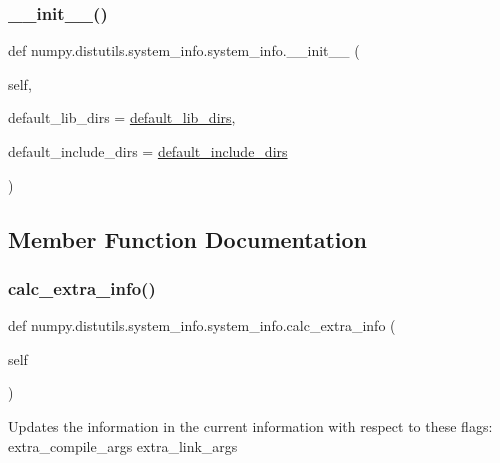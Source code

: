 \subsubsection{\texorpdfstring{\+\_\+\+\_\+init\+\_\+\+\_\+()}{\_\_init\_\_()}}
{\footnotesize\ttfamily def numpy.\+distutils.\+system\+\_\+info.\+system\+\_\+info.\+\_\+\+\_\+init\+\_\+\+\_\+ (\begin{DoxyParamCaption}\item[{}]{self,  }\item[{}]{default\+\_\+lib\+\_\+dirs = {\ttfamily \hyperlink{namespacenumpy_1_1distutils_1_1system__info_ac60e6bb3dff22d8f4f250d1b4ba42899}{default\+\_\+lib\+\_\+dirs}},  }\item[{}]{default\+\_\+include\+\_\+dirs = {\ttfamily \hyperlink{namespacenumpy_1_1distutils_1_1system__info_ad2cd2857056589dcb7cacb98be3d2b20}{default\+\_\+include\+\_\+dirs}} }\end{DoxyParamCaption})}



\subsection{Member Function Documentation}
\mbox{\label{classnumpy_1_1distutils_1_1system__info_1_1system__info_a92b4677adcef6477660b80b657c94a52}} 
\subsubsection{\texorpdfstring{calc\+\_\+extra\+\_\+info()}{calc\_extra\_info()}}
{\footnotesize\ttfamily def numpy.\+distutils.\+system\+\_\+info.\+system\+\_\+info.\+calc\+\_\+extra\+\_\+info (\begin{DoxyParamCaption}\item[{}]{self }\end{DoxyParamCaption})}

\begin{DoxyVerb}Updates the information in the current information with
respect to these flags:
  extra_compile_args
  extra_link_args
\end{DoxyVerb}
 \mbox{\label{classnumpy_1_1distutils_1_1system__info_1_1system__info_ac692017a5463945198c8bd0fe8ef2e14}} 
